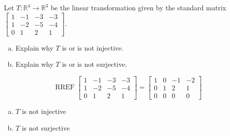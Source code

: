 
\begin{exerciseStatement}
 Let \(T:\mathbb{R}^ 4  \to \mathbb{R}^ 3 \) be the linear transformation given by the standard matrix \( \left[\begin{array}{cccc}
1 & -1 & -3 & -3 \\
1 & -2 & -5 & -4 \\
0 & 1 & 2 & 1
\end{array}\right] .\)
\begin{enumerate}[(a)]
\item Explain why \(T\) is or is not injective.
\item Explain why \(T\) is or is not surjective.
\end{enumerate}
    
\end{exerciseStatement}
    
\begin{exerciseAnswer} 


\[\operatorname{RREF} \left[\begin{array}{cccc}
1 & -1 & -3 & -3 \\
1 & -2 & -5 & -4 \\
0 & 1 & 2 & 1
\end{array}\right] = \left[\begin{array}{cccc}
1 & 0 & -1 & -2 \\
0 & 1 & 2 & 1 \\
0 & 0 & 0 & 0
\end{array}\right] \]


\begin{enumerate}[(a)]
\item \(T\) is not injective
\item \(T\) is not surjective
\end{enumerate}
    
\end{exerciseAnswer}
    
